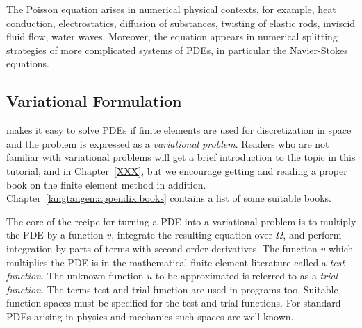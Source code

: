 The Poisson equation  arises in numerical physical
contexts, for example, heat conduction, electrostatics,
diffusion of substances, twisting of
elastic rods, inviscid fluid flow, water waves. Moreover, the equation
appears in numerical splitting strategies of more complicated systems
of PDEs, in particular the Navier-Stokes equations.


\subsection{Variational Formulation}
\label{langtangen:poisson1:varform}

\fenics{} makes it easy to solve PDEs if finite elements are used for
discretization in space and the problem is expressed as a
\emph{variational problem}. Readers who are not familiar with
variational problems will get a brief introduction
to the topic in this tutorial, and in Chapter~\ref{XXX},
but we encourage getting and reading
a proper book on the finite element method in addition.
Chapter~\ref{langtangen:appendix:books} contains a list of some suitable
books.

The core of the recipe for turning a PDE into a variational problem
is to multiply the PDE by a function $v$, integrate the resulting
equation over $\Omega$, and perform integration by parts of terms with
second-order derivatives. The function $v$ which multiplies the PDE
is in the mathematical finite element literature
called a \emph{test function}. The unknown function $u$ to be approximated
is referred to
as a \emph{trial function}. The terms test and trial function are used
in \fenics{} programs too.
Suitable
function spaces must be specified for the test and trial functions.
For standard PDEs arising in physics and mechanics such spaces are
well known.

